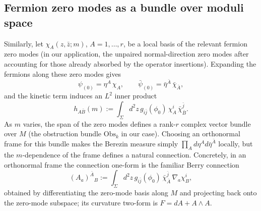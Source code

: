\documentclass[12pt]{article}
\begin{document}
\subsection{Fermion zero modes as a bundle over moduli space}
Similarly, let $\chi_A(z,\bar z;m)$, $A=1,\dots,r$, be a local basis of the
relevant fermion zero modes (in our application, the unpaired normal-direction
zero modes after accounting for those already absorbed by the operator
insertions). Expanding the fermions along these zero modes gives
\begin{equation*}
  \psi_{(0)}=\eta^A\,\chi_A,\qquad \bar\psi_{(0)}=\bar\eta^{\bar A}\,\bar\chi_{\bar A},
\end{equation*}
and the kinetic term induces an $L^2$ inner product
\begin{equation*}
  h_{A\bar B}(m):=\int_\Sigma d^2z\, g_{i\bar j}(\phi_0)\,\chi_A^i\,\bar\chi_{\bar B}^{\bar j}.
\end{equation*}
As $m$ varies, the span of the zero modes defines a rank-$r$ complex vector
bundle over $M$ (the obstruction bundle $\mathrm{Obs}_k$ in our case). Choosing
an orthonormal frame for this bundle makes the Berezin measure simply
$\prod_A d\eta^A d\bar\eta^{\bar A}$ locally, but the $m$-dependence of the
frame defines a natural connection. Concretely, in an orthonormal frame the
connection one-form is the familiar Berry connection
\begin{equation*}
  (A_a)^{\bar A}{}_B := \int_\Sigma d^2z\, g_{i\bar j}(\phi_0)\,
  \bar\chi_{\bar A}^{\bar j}\,\nabla_a \chi_B^i,
\end{equation*}
obtained by differentiating the zero-mode basis along $M$ and projecting back
onto the zero-mode subspace; its curvature two-form is $F=dA+A\wedge A$.
\end{document}
